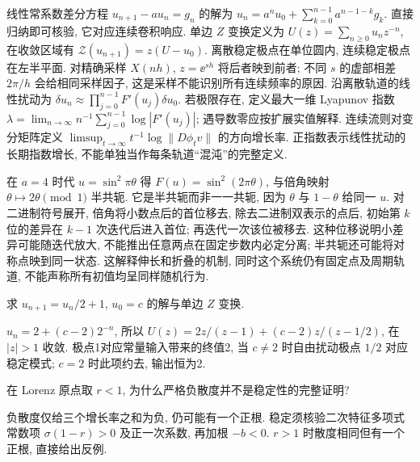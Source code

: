 线性常系数差分方程 $u_{n+1}-a u_n=g_n$ 的解为 $u_n=a^nu_0+\sum_{k=0}^{n-1}a^{n-1-k}g_k$. 直接归纳即可核验, 它对应连续卷积响应. 单边 $Z$ 变换定义为 $U(z)=\sum_{n\ge0}u_nz^{-n}$, 在收敛区域有 $\mathcal Z(u_{n+1})=z(U-u_0)$. 离散稳定极点在单位圆内, 连续稳定极点在左半平面. 对精确采样 $X(nh)$, $z=\ee^{sh}$ 将后者映到前者; 不同 $s$ 的虚部相差 $2\pi/h$ 会给相同采样因子, 这是采样不能识别所有连续频率的原因.
沿离散轨道的线性扰动为 $\delta u_n\approx\prod_{j=0}^{n-1}F'(u_j)\delta u_0$. 若极限存在, 定义最大一维 Lyapunov 指数
$\lambda=\lim_{n\to\infty}n^{-1}\sum_{j=0}^{n-1}\log|F'(u_j)|$; 遇导数零应按扩展实值解释. 连续流则对变分矩阵定义 $\limsup_{t\to\infty}t^{-1}\log\|D\phi_t v\|$ 的方向增长率. 正指数表示线性扰动的长期指数增长, 不能单独当作每条轨道“混沌”的完整定义.

在 $a=4$ 时代 $u=\sin^2\pi\theta$ 得 $F(u)=\sin^2(2\pi\theta)$, 与倍角映射 $\theta\mapsto2\theta\pmod1$ 半共轭. 它是半共轭而非一一共轭, 因为 $\theta$ 与 $1-\theta$ 给同一 $u$. 对二进制符号展开, 倍角将小数点后的首位移去, 除去二进制双表示的点后, 初始第 $k$ 位的差异在 $k-1$ 次迭代后进入首位; 再迭代一次该位被移去. 这种位移说明小差异可能随迭代放大, 不能推出任意两点在固定步数内必定分离; 半共轭还可能将对称点映到同一状态. 这解释伸长和折叠的机制, 同时这个系统仍有固定点及周期轨道, 不能声称所有初值均呈同样随机行为.
\begin{exercise}求 $u_{n+1}=u_n/2+1$, $u_0=c$ 的解与单边 $Z$ 变换.\end{exercise}
\begin{solution}$u_n=2+(c-2)2^{-n}$, 所以 $U(z)=2z/(z-1)+(c-2)z/(z-1/2)$, 在 $|z|>1$ 收敛. 极点1对应常量输入带来的终值2, 当 $c\ne2$ 时自由扰动极点 $1/2$ 对应稳定模式; $c=2$ 时此项约去, 输出恒为2.\end{solution}
\begin{exercise}在 Lorenz 原点取 $r<1$, 为什么严格负散度并不是稳定性的完整证明?\end{exercise}
\begin{solution}负散度仅给三个增长率之和为负, 仍可能有一个正根. 稳定须核验二次特征多项式常数项 $\sigma(1-r)>0$ 及正一次系数, 再加根 $-b<0$. $r>1$ 时散度相同但有一个正根, 直接给出反例.\end{solution}
